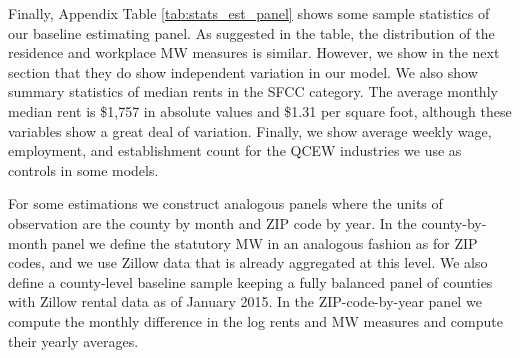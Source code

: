 Finally, Appendix Table \ref{tab:stats_est_panel} shows some sample statistics 
of our baseline estimating panel.
As suggested in the table, the distribution of the residence and workplace MW 
measures is similar.
However, we show in the next section that they do show independent variation
in our model.
We also show summary statistics of median rents in the SFCC category.
The average monthly median rent is \$1,757 in absolute values and \$1.31 
per square foot, although these variables show a great deal of variation.
Finally, we show average weekly wage, employment, and establishment count 
for the QCEW industries we use as controls in some models.

For some estimations we construct analogous panels where the units of 
observation are the county by month and ZIP code by year.
In the county-by-month panel we define the statutory MW in an analogous fashion 
as for ZIP codes, and we use Zillow data that is already aggregated at this 
level.
We also define a county-level baseline sample keeping a fully balanced panel of 
counties with Zillow rental data as of January 2015.
In the ZIP-code-by-year panel we compute the monthly difference in the log rents 
and MW measures and compute their yearly averages.
